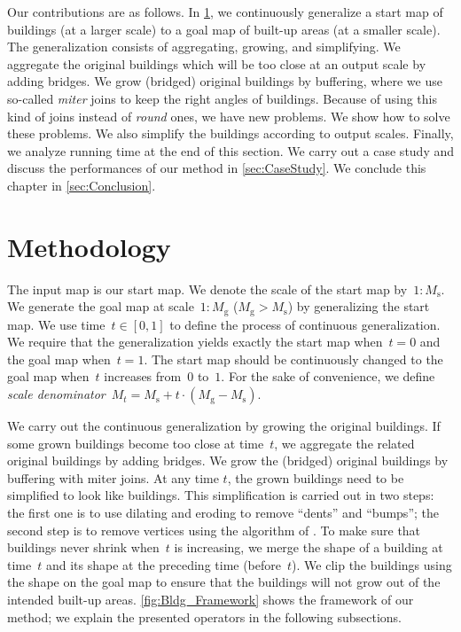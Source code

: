 Our contributions are as follows.
In \sect\ref{sec:Methodology},
we continuously generalize a start map of buildings
(at a larger scale) 
to a goal map of built-up areas (at a smaller scale).
The generalization consists of 
aggregating, growing, and simplifying.
We aggregate the original buildings which will be too close 
at an output scale by adding bridges.
We grow (bridged) original buildings by buffering,
where we use so-called \emph{miter} joins to keep the right 
angles of buildings.
Because of using this kind of joins 
instead of \emph{round} ones,
we have new problems.
We show how to solve these problems.
We also simplify the buildings according to output scales.
Finally, we analyze running time at the end of this section.
We carry out a case study 
and discuss the performances of our method in 
\sect\ref{sec:CaseStudy}.
We conclude this chapter in \sect\ref{sec:Conclusion}.

\section{Methodology}
\label{sec:Methodology}
The input map is our start map.
We denote the scale of the start map by~$1:M_\mathrm{s}$.
We generate the goal map at scale~$1:M_\mathrm{g}$ 
($M_\mathrm{g} > M_\mathrm{s}$) by generalizing the start map. 
We use time~$t\in[0,1]$ to define 
the process of continuous generalization. 
We require that 
the generalization yields exactly the start map when~$t=0$ 
and the goal map when~$t=1$.
The start map should be continuously changed to the goal map 
when~$t$ increases from~$0$ to~$1$.
For the sake of convenience, we define 
\emph{scale denominator}~$M_t= 
M_\mathrm{s} + t \cdot (M_\mathrm{g}-M_\mathrm{s})$.

We carry out the continuous generalization 
by growing the original buildings. 
If some grown buildings become too close at time~$t$,
we aggregate the related original buildings by adding bridges.
We grow the (bridged) original buildings 
by buffering with miter joins.
At any time $t$, the grown buildings 
need to be simplified to look like buildings.
This simplification is carried out in two steps:
the first one is to use dilating and eroding 
to remove ``dents'' and ``bumps''; 
the second step is to remove vertices 
using the algorithm of \citet{ImaiIri1988}.
To make sure that buildings never shrink 
when~$t$ is increasing,
we merge the shape of a building at time~$t$ 
and its shape at the preceding time (before~$t$). 
We clip the buildings using the shape on the goal map to 
ensure that the buildings will not 
grow out of the intended built-up areas.
\fig\ref{fig:Bldg_Framework} shows 
the framework of our method;
we explain the presented operators
in the following subsections.





